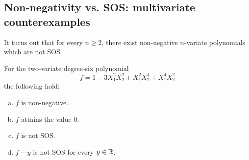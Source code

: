 \subsection{Non-negativity vs. SOS: multivariate counterexamples} 

It turns out that for every $n \ge 2$, there exist non-negative $n$-variate polynomials which are not SOS. 

\begin{proposition}
	\label{motzkin}
	For the two-variate degree-six polynomial 
	\[
		f = 1 -3 X_1^2 X_2^2 + X_1^2 X_2^4 + X_1^4 X_2^2
	\]
	the following hold:
	\begin{enumerate}[(a)]
		\item $f$ is non-negative.
		\item $f$ attains the value $0$.
		\item $f$ is not SOS. 
		\item $f-y$ is not SOS for every $y \in \mathbb{R}$. 
	\end{enumerate}
\end{proposition}
